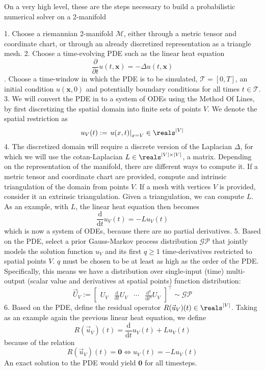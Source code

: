 \ifdefined\COMPILINGFROMMAIN
\else
    
    
\fi



On a very high level, these are the steps necessary to build a probabilistic numerical solver on a 2-manifold

1. Choose a riemannian 2-manifold $\mathcal{M}$, either through a metric tensor and coordinate chart, or through an already discretized representation as a triangle mesh.
2. Choose a time-evolving PDE such as the linear heat equation $$\frac{\partial}{\partial t}u(t,\mathbf{x}) = -\Delta u(t,\mathbf{x})$$. Choose a time-window in which the PDE is to be simulated, $\mathcal{T} = [0, T]$, an initial condition $u(\mathbf{x}, 0)$ and potentially boundary conditions for all times $t\in \mathcal{T}$.
3. We will convert the PDE in to a system of ODEs using the Method Of Lines, by first discretizing the spatial domain into finite sets of points $V$. We denote the spatial restriction as $$u_V(t) := \left . u(x,t)\right|_{x=V} \in \reals^{|V|}$$
4. The discretized domain will require a discrete version of the Laplacian $\Delta$, for which we will use the cotan-Laplacian $L \in \reals^{|V|\times |V|}$, a matrix. Depending on the representation of the manifold, there are different ways to compute it.  If a metric tensor and coordinate chart are provided, compute and intrinsic triangulation of the domain from points $V$. If a mesh with vertices $V$ is provided, consider it an extrinsic triangulation. Given a triangulation, we can compute $L$. As an example, with $L$, the linear heat equation then becomes $$\frac{\text{d}}{\text{d} t}u_V(t) = -Lu_V(t)$$ which is now a system of ODEs, because there are no partial derivatives.
5. Based on the PDE, select a prior Gauss-Markov process distribution $\mathcal{GP}$ that jointly models the solution function $u_V$ and its first $q\geq 1$ time-derivatives restricted to spatial points $V$. $q$ must be chosen to be at least as high as the order of the PDE. Specifically, this means we have a distribution over single-input (time) multi-output (scalar value and derivatives at spatial points) function distribution: $$\vec{U}_V :=\begin{bmatrix} U_V & \frac{\text{d}}{\text{d} t} U_V & \cdots & \frac{\text{d}^q}{\text{d} t^q} U_V\end{bmatrix}^{\intercal} \sim \mathcal{GP}$$
6. Based on the PDE, define the residual operator $R(\vec{u}_V)(t) \in \reals^{|V|}$. Taking as an example  again the previous linear heat equation, we define $$R(\vec{u}_V)(t) = \frac{\text{d}}{\text{d} t}u_V(t) + L u_V(t)$$ because of the relation $$R(\vec{u}_V)(t) = \mathbf{0} \iff u_V(t) = -Lu_V(t)$$ An exact solution to the PDE would yield $\mathbf{0}$ for all timesteps. 

